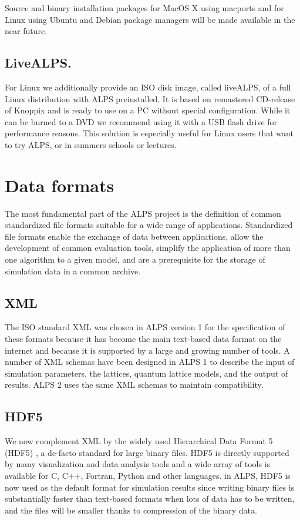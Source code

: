 \documentclass[12pt]{iopart}
\begin{document}
Source and binary installation packages for MacOS X using macports \cite{macports} and for Linux using Ubuntu and Debian package managers will be made available in the near future.


\subsection{LiveALPS.}

For Linux we additionally provide an ISO disk image, called liveALPS, of a full Linux distribution with ALPS preinstalled.  It is  
based on remastered CD-release of Knoppix \cite{knoppix} and is ready to use 
on a PC without special configuration. While it can be burned to a DVD we recommend using it with a USB flash drive for performance reasons.
This  solution is especially useful for Linux users that want to try ALPS, or in summers schools or lectures.

\section{Data formats}

The most fundamental part of the ALPS project is the definition of
common standardized file formats suitable for a wide range of
applications. Standardized file formats enable the exchange of data
between applications, allow the development of common evaluation
tools, simplify the application of more than one algorithm to a given
model, and are a prerequisite for the storage of simulation data in a
common archive.

\subsection{XML}
 The ISO
standard XML \cite{xml} was chosen in ALPS version 1 \cite{ALPS1.2,ALPS1.3} for the specification of these formats
because it has become
the main text-based data format on the internet and because it is
supported by a large and growing number of tools.
A number of XML  schemas \cite{xmlschema} have been designed in ALPS 1 to describe the input of simulation parameters,  the lattices,  quantum lattice models, and the output of results. ALPS 2 uses the same XML schemas to maintain compatibility.

\subsection{HDF5}

We now complement XML by the widely used Hierarchical Data Format 5 (HDF5) \cite{hdf5}, a de-facto standard for large binary files.  HDF5 is directly supported by many visualization and data analysis tools and a wide array of tools is 
available for C, C++, Fortran, Python and other languages. in ALPS, HDF5 is now used as the default format for simulation results since writing binary files is substantially faster than text-based formats when lots of data has to be written, and the files will be smaller thanks to compression of the binary data. 
\end{document}
